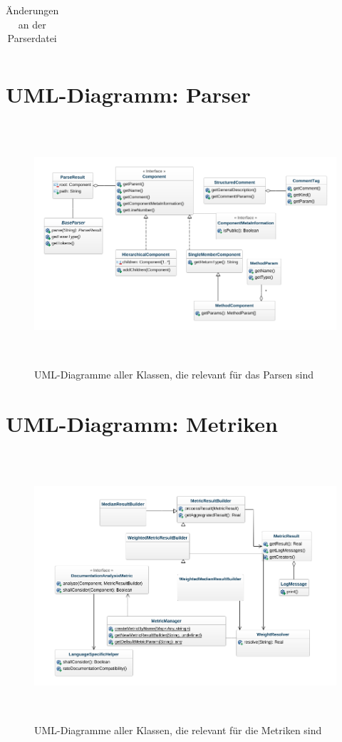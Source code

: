 \begin{appendices}
\begin{table}[h!]
\begin{tabular}{m{0.75cm}|m{4cm}|m{10cm}}
    \end{tabular}
    \caption{Änderungen an der Parserdatei}
    \label{tab:parser_changes}
\end{table}

\chapter{UML-Diagramm: Parser}
\begin{figure}[ht!]
\fontsize{5}{10}\selectfont
    \centering
    \includegraphics[height=9cm,keepaspectratio,angle=90]{figures/uml/parsing.png}
    \caption{UML-Diagramme aller Klassen, die relevant für das Parsen sind}
    \label{fig:uml_parsing}
\end{figure}
\chapter{UML-Diagramm: Metriken}
\begin{figure}[ht!]
\fontsize{5}{10}\selectfont
    \centering
    \includegraphics[height=10cm,keepaspectratio,angle=90]{figures/uml/metriken.png}
    \caption{UML-Diagramme aller Klassen, die relevant für die Metriken sind}
    \label{fig:uml_metrics}
\end{figure}

\end{appendices}
